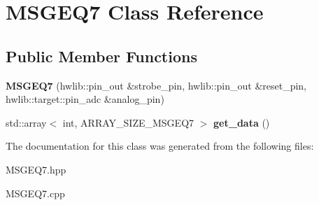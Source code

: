 \hypertarget{class_m_s_g_e_q7}{}\section{M\+S\+G\+E\+Q7 Class Reference}
\label{class_m_s_g_e_q7}
\subsection*{Public Member Functions}
\begin{DoxyCompactItemize}
\item 
\mbox{\label{class_m_s_g_e_q7_a63a783874c347abbc21d1363683640c3}} 
{\bfseries M\+S\+G\+E\+Q7} (hwlib\+::pin\+\_\+out \&strobe\+\_\+pin, hwlib\+::pin\+\_\+out \&reset\+\_\+pin, hwlib\+::target\+::pin\+\_\+adc \&analog\+\_\+pin)
\item 
\mbox{\label{class_m_s_g_e_q7_a80f5d7c22e3497f09d0c82fd3c376909}} 
std\+::array$<$ int, A\+R\+R\+A\+Y\+\_\+\+S\+I\+Z\+E\+\_\+\+M\+S\+G\+E\+Q7 $>$ {\bfseries get\+\_\+data} ()
\end{DoxyCompactItemize}


The documentation for this class was generated from the following files\+:\begin{DoxyCompactItemize}
\item 
M\+S\+G\+E\+Q7.\+hpp\item 
M\+S\+G\+E\+Q7.\+cpp\end{DoxyCompactItemize}
